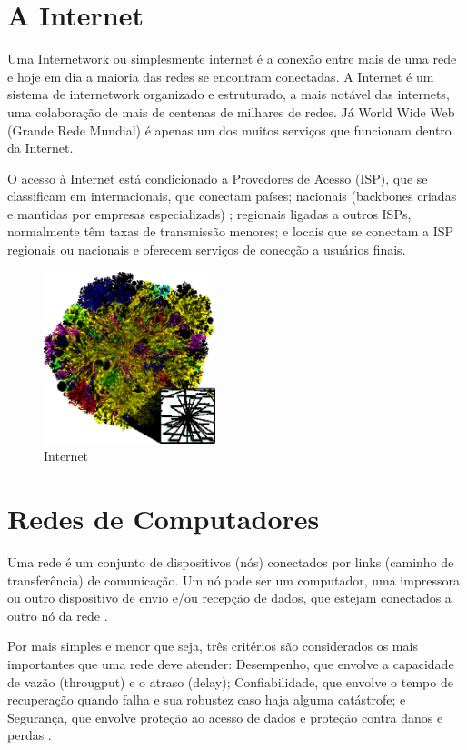 \documentclass[conference,compsoc]{IEEEtran}
\begin{document}
\section{A Internet}

Uma Internetwork ou simplesmente internet é a conexão entre mais de uma rede e hoje em dia a maioria das redes se encontram conectadas.  A Internet é um sistema de internetwork organizado e estruturado, a mais notável das internets, uma colaboração de mais de centenas de milhares de redes. Já World Wide Web (Grande Rede Mundial) é apenas um dos muitos serviços que funcionam dentro da Internet. 

O acesso à Internet está condicionado a Provedores de Acesso (ISP), que se classificam em internacionais, que conectam países; nacionais (backbones criadas e mantidas por empresas especializads) ; regionais ligadas a outros ISPs, normalmente têm taxas de transmissão menores; e locais que se conectam a ISP regionais ou nacionais e oferecem serviços de conecção a usuários finais.


\begin{figure}[!h]
\centering
\caption{Internet}
\includegraphics[width=50mm]{Figuras/internet_map.eps}
\end{figure}



\section{Redes de Computadores}
Uma rede é um conjunto de dispositivos (nós) conectados por links (caminho de transferência) de comunicação.  Um nó pode ser um computador, uma impressora ou outro dispositivo de envio e/ou recepção de dados, que estejam conectados a outro nó da rede \cite{Forouzan}.

Por mais simples e menor que seja, três critérios são considerados os mais importantes que uma rede deve atender: Desempenho, que envolve a capacidade de vazão (througput) e o atraso (delay); Confiabilidade, que envolve o tempo de recuperação quando falha e sua robustez caso haja alguma catástrofe; e Segurança, que envolve proteção ao acesso de dados e proteção contra danos e perdas \cite{Forouzan} \cite{Specialski}.
\end{document}
